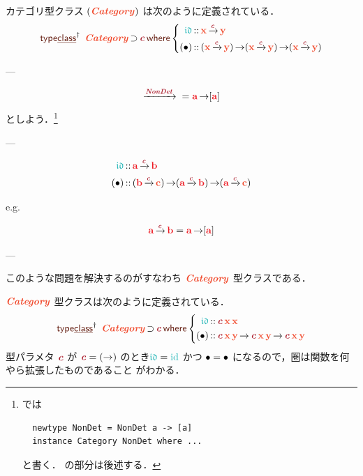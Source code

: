 \documentclass[a5paper,twoside,fleqn,draft]{jsbook}
\begin{document}
カテゴリ型クラス $(\mCatTypeClass)$ は次のように定義されている．
\begin{equation}
  \mTypeClassDeclPolymorphic\;
  \mCatTypeClass\hHasElementsOf\mTypeConstructor{c}
  \mWhere\left\{
  \begin{aligned}
    \mIdCat
    &\hIsTypeOf\mX\mCatArrowC\mY\\
    (\mCompCat)
    &\hIsTypeOf{}(\mX\mCatArrowC\mY)\hFunctionArrow(\mX\mCatArrowC\mY)\hFunctionArrow(\mX\mCatArrowC\mY)
  \end{aligned}
  \right.
\end{equation}

---

\begin{equation}
  \mCatArrow{\mTypeConstructor{NonDet}}{}
  =\hTypeName{a}\hFunctionArrow\hListConstruct{\hTypeName{a}}
\end{equation}
としよう．\footnote{\haskell では
\begin{verbatim}
  newtype NonDet = NonDet a -> [a]
  instance Category NonDet where ...
\end{verbatim}
と書く． の部分は後述する．}

---

\begin{align}
  \mIdCat
  &\hIsTypeOf{}\hTypeName{a}\mCatArrowC\hTypeName{b}\\
  (\mCompCat)
  &\hIsTypeOf{}(\hTypeName{b}\mCatArrowC\mC)
  \hFunctionArrow(\hTypeName{a}\mCatArrowC\hTypeName{b})
  \hFunctionArrow(\hTypeName{a}\mCatArrowC\mC)
\end{align}

e.g.

\begin{equation}
  \hTypeName{a}\mCatArrowC\hTypeName{b}
  =\hTypeName{a}\hFunctionArrow\hListConstruct{\hTypeName{a}}
\end{equation}

---


このような問題を解決するのがすなわち
$\mCatTypeClass$ 型クラスである．

$\mCatTypeClass$ 型クラスは次のように定義されている．
\begin{equation}
  \mTypeClassDeclPolymorphic\;
  \mCatTypeClass\hHasElementsOf\mTypeConstructor{c}
  \mWhere\left\{
  \begin{aligned}
    \mIdCat&\hIsTypeOf\mTypeConstructor{c}\,\mX\,\mX\\
    (\mCompCat)
    &\hIsTypeOf\mTypeConstructor{c}\,\mX\,\mY
    \hFunctionArrow\mTypeConstructor{c}\,\mX\,\mY
    \hFunctionArrow\mTypeConstructor{c}\,\mX\,\mY
  \end{aligned}
  \right.
\end{equation}
型パラメタ $\mTypeConstructor{c}$ が
$\mTypeConstructor{c}=(\hFunctionArrow)$ のとき$\mIdCat=\mId$ かつ
$\operatorname{\bullet}=\operatorname{\bullet}$ になるので，圏は関数を何やら拡張したものであること
がわかる．
\end{document}
